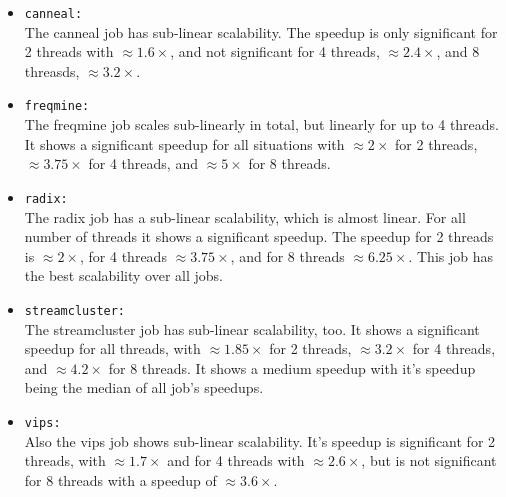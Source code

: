 \begin{enumerate}
\begin{enumerate}
\begin{itemize}
            \item \texttt{canneal:} %
            \\ The canneal job has sub-linear scalability. The speedup is only significant for 2 threads with $\approx 1.6 \times$, and not significant for 4 threads, $\approx 2.4 \times$, and 8 threasds, $\approx 3.2 \times$.
            
            \item \texttt{freqmine:} %
            \\ The freqmine job scales sub-linearly in total, but linearly for up to 4 threads. It shows a significant speedup for all situations with $\approx 2 \times$ for 2 threads, $\approx 3.75 \times$ for 4 threads, and $\approx 5 \times$ for 8 threads.

            \item \texttt{radix:} %
            \\ The radix job has a sub-linear scalability, which is almost linear. For all number of threads it shows a significant speedup. The speedup for 2 threads is $\approx 2 \times$, for 4 threads $\approx 3.75 \times$, and for 8 threads $\approx 6.25 \times$. This job has the best scalability over all jobs.

            \item \texttt{streamcluster:} %
            \\ The streamcluster job has sub-linear scalability, too. It shows a significant speedup for all threads, with $\approx 1.85 \times$ for 2 threads, $\approx 3.2 \times$ for 4 threads, and $\approx 4.2 \times$ for 8 threads. It shows a medium speedup with it's speedup being the median of all job's speedups.

            \item \texttt{vips:} %
            \\ Also the vips job shows sub-linear scalability. It's speedup is significant for 2 threads, with $\approx 1.7 \times$ and for 4 threads with $\approx 2.6 \times$, but is not significant for 8 threads with a speedup of $\approx 3.6 \times$.
         \end{itemize}
    \end{enumerate}    
\end{enumerate}

\newpage
